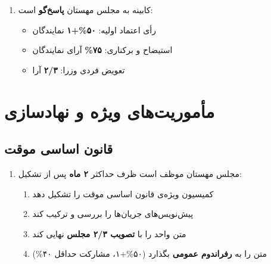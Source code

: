 \documentclass[12pt, a4paper, openright, twoside]{book}
\begin{document}
	\begin{enumerate}[rightmargin=1em, leftmargin=0pt, itemsep=6pt,
		label=\textbf{بند \arabic*.}, start=12]
		
		\item کابینه به مجلس مهستان \textbf{پاسخ‌گو} است:
		\begin{itemize}[rightmargin=1.5em, leftmargin=0pt, itemsep=2pt]
			\item رأی اعتماد اولیه: \textbf{۵۰\%+۱} نمایندگان
			\item استیضاح و برکناری: \textbf{۷۵\%} آرای نمایندگان
			\item تعویض فردی وزرا: \textbf{۲/۳} آرا
		\end{itemize}
	\end{enumerate}
	
	\chapter{مأموریت‌های ویژه و نهادسازی}
	
	\section{قانون اساسی موقت}
	
	\begin{enumerate}[rightmargin=1em, leftmargin=0pt, itemsep=6pt,
		label=\textbf{بند \arabic*.}, start=14]
		
		\item مجلس مهستان موظف است ظرف حداکثر \textbf{۲ ماه} پس از تشکیل:
		\begin{enumerate}[rightmargin=1.5em, leftmargin=0pt, itemsep=3pt,
			label=\arabic{enumi}.\arabic{enumii}.]
			\item کمیسیون ویژه‌ی قانون اساسی موقت را تشکیل دهد
			\item پیش‌نویس‌های جریان‌ها را بررسی و ترکیب کند
			\item متن واحد را با \textbf{تصویب ۲/۳ مجلس} نهایی کند
			\item متن را به \textbf{رفراندوم عمومی} بگذارد (۵۰\%+۱، مشارکت حداقل ۴۰\%)
		\end{enumerate}
	\end{enumerate}
	
\end{document}
